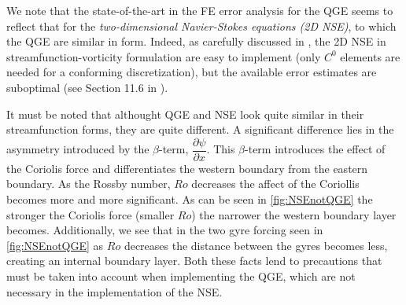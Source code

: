 We note that the state-of-the-art in the FE error analysis for the QGE seems to
reflect that for the \emph{two-dimensional Navier-Stokes equations (2D NSE)}, to
which the QGE are similar in form.  Indeed, as carefully discussed in
\cite{Gunzburger89}, the 2D NSE in streamfunction-vorticity formulation are easy
to implement (only $C^0$ elements are needed for a conforming discretization),
but the available error estimates are suboptimal (see Section 11.6 in
\cite{Gunzburger89}).
\begin{remark}
  It must be noted that althought QGE and NSE look quite similar in their
  streamfunction forms, they are quite different. A significant difference lies
  in the asymmetry introduced by the $\beta$-term, $\dfrac{\partial
  \psi}{\partial x}$. This $\beta$-term introduces the effect of the Coriolis
  force and differentiates the western boundary from the eastern boundary.
  As the Rossby number, $Ro$ decreases the affect of the Coriollis becomes more
  and more significant. As can be seen in \autoref{fig:NSEnotQGE} the stronger
  the Coriolis force (smaller $Ro$) the narrower the western boundary layer
  becomes. Additionally, we see that in the two gyre forcing seen in
  \autoref{fig:NSEnotQGE} as $Ro$ decreases the distance between the gyres
  becomes less, creating an internal boundary layer. Both these facts lend to
  precautions that must be taken into account when implementing the QGE, which
  are not necessary in the implementation of the NSE.
\end{remark}

